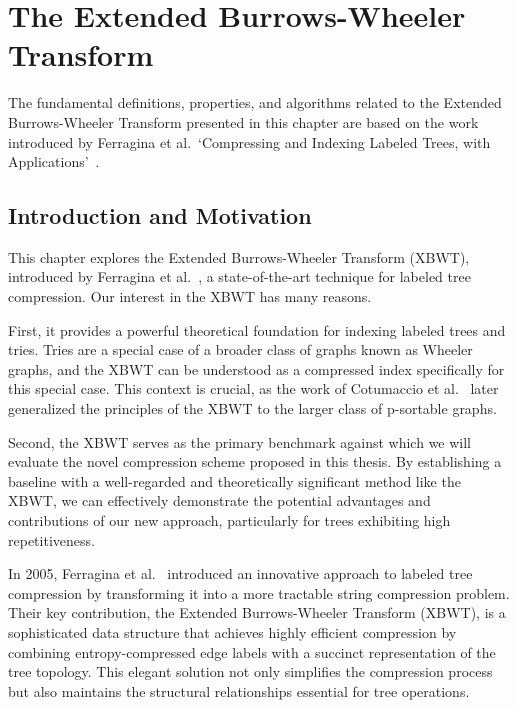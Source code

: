 \section[The Extended Burrows-Wheeler Transform]{The Extended Burrows-Wheeler \\ Transform} \label{chp:tree_compression}
The fundamental definitions, properties, and algorithms related to the Extended Burrows-Wheeler Transform presented in this chapter are based on the work introduced by Ferragina et al.~`Compressing and Indexing Labeled Trees, with Applications'~\cite{ferragina2009compressing}.

\subsection{Introduction and Motivation}
This chapter explores the Extended Burrows-Wheeler Transform (XBWT), introduced by Ferragina et al.~\cite{ferragina2009compressing}, a state-of-the-art technique for labeled tree compression. Our interest in the XBWT has many reasons.

First, it provides a powerful theoretical foundation for indexing labeled trees and tries. Tries are a special case of a broader class of graphs known as Wheeler graphs, and the XBWT can be understood as a compressed index specifically for this special case. This context is crucial, as the work of Cotumaccio et al.~\cite{cotumaccio2021indexing} later generalized the principles of the XBWT to the larger class of p-sortable graphs.

Second, the XBWT serves as the primary benchmark against which we will evaluate the novel compression scheme proposed in this thesis. By establishing a baseline with a well-regarded and theoretically significant method like the XBWT, we can effectively demonstrate the potential advantages and contributions of our new approach, particularly for trees exhibiting high repetitiveness.

In 2005, Ferragina et al.~\cite{ferragina2009compressing} introduced an innovative approach to labeled tree compression by transforming it into a more tractable string compression problem. Their key contribution, the Extended Burrows-Wheeler Transform (XBWT), is a sophisticated data structure that achieves highly efficient compression by combining entropy-compressed edge labels with a succinct representation of the tree topology. This elegant solution not only simplifies the compression process but also maintains the structural relationships essential for tree operations.


